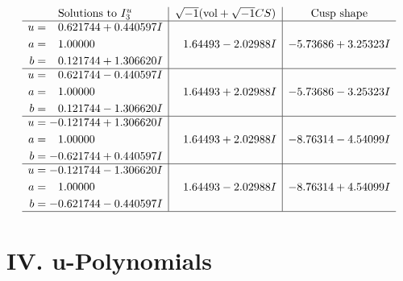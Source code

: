\documentclass[1p]{elsarticle_modified}
\theoremstyle{definition}
\newcommand{\I}{\sqrt{-1}}
\begin{document}
$$\begin{array}{c|c|c}  
\text{Solutions to }I^u_{3}& \I (\text{vol} + \sqrt{-1}CS) & \text{Cusp shape}\\
 \hline 
\begin{aligned}
u &= \phantom{-}0.621744 + 0.440597 I \\
a &= \phantom{-}1.00000\phantom{ +0.000000I} \\
b &= \phantom{-}0.121744 + 1.306620 I\end{aligned}
 & \phantom{-}1.64493 - 2.02988 I & -5.73686 + 3.25323 I \\ \hline\begin{aligned}
u &= \phantom{-}0.621744 - 0.440597 I \\
a &= \phantom{-}1.00000\phantom{ +0.000000I} \\
b &= \phantom{-}0.121744 - 1.306620 I\end{aligned}
 & \phantom{-}1.64493 + 2.02988 I & -5.73686 - 3.25323 I \\ \hline\begin{aligned}
u &= -0.121744 + 1.306620 I \\
a &= \phantom{-}1.00000\phantom{ +0.000000I} \\
b &= -0.621744 + 0.440597 I\end{aligned}
 & \phantom{-}1.64493 + 2.02988 I & -8.76314 - 4.54099 I \\ \hline\begin{aligned}
u &= -0.121744 - 1.306620 I \\
a &= \phantom{-}1.00000\phantom{ +0.000000I} \\
b &= -0.621744 - 0.440597 I\end{aligned}
 & \phantom{-}1.64493 - 2.02988 I & -8.76314 + 4.54099 I\\
 \hline 
 \end{array}$$\newpage
\newpage\renewcommand{\arraystretch}{1}
\centering \section*{ IV. u-Polynomials}
\end{document}
